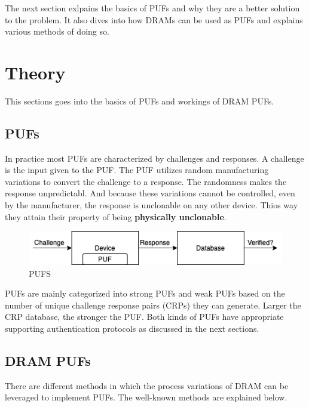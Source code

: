 \documentclass[journal, a4paper]{IEEEtran}
\begin{document}
The next section exlpains the basics of PUFs and why they are a better solution to the problem. It also dives into how DRAMs can be used as PUFs and explains various methods of doing so.

\section{Theory}
This sections goes into the basics of PUFs and workings of DRAM PUFs.
\vspace{-0.9em}
\subsection{PUFs}

In practice most PUFs are characterized by challenges and responses. A challenge is the input given to the PUF. The PUF utilizes random manufacturing variations to convert the challenge to a response. The randomness makes the response unpredictabl. And because these variations cannot be controlled, even by the manufacturer, the response is unclonable on any other device. Thios way they attain their property of being \textbf{physically unclonable}.

\begin{figure}[!hbt]
    \centering
    \includegraphics[scale=0.5]{figs/PUF.png}
    \setlength{\belowcaptionskip}{-10pt}
    \caption{PUFS}
    \label{fig:tf_plot}

\end{figure}

PUFs are mainly categorized into strong PUFs and weak PUFs based on the number of unique challenge response pairs (CRPs) they can generate. Larger the CRP database, the stronger the PUF. Both kinds of PUFs have appropriate supporting authentication protocols as discussed in the next sections.

\vspace{-0.9em}

\subsection{DRAM PUFs}
There are different methods in which the process variations of DRAM can be leveraged to implement PUFs. The well-known methods are explained below.
\end{document}
